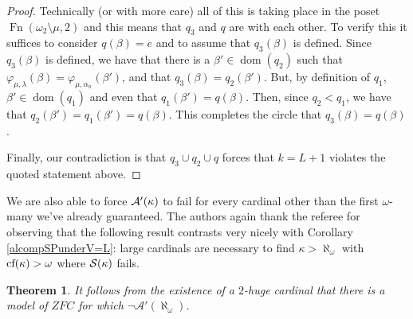 \documentclass{rmmcart}
\theoremstyle{plain}
\newtheorem{theorem}{Theorem}
\theoremstyle{definition}
\theoremstyle{remark}
\theoremstyle{plain}
\theoremstyle{definition}
\theoremstyle{remark}
\begin{document}
\begin{proof}
            Technically (or with more care)  all of this is taking place in the
            poset $\operatorname{Fn}(\omega_2\setminus \mu,2)$ and this means
            that $q_3$ and $q$ are  with each other.
            To verify this it suffices to consider
             $q(\beta)=e$ and to assume that $q_3(\beta)$ is defined.
            Since $q_3(\beta)$ is defined, we have that
            there is a  $\beta'\in\mathop{dom}(q_2)$ such that $
             \varphi_{\mu,\lambda}(\beta) = \varphi_{\mu,\alpha_n}(\beta')$,
            and that $q_3(\beta) = q_2(\beta')$.
            But, by definition of $q_1$, $\beta'\in\mathop{dom}(q_1)$
            and even  that $q_1(\beta') = q(\beta)$.
             Then, since $q_2<q_1$, we have that $q_2(\beta')=q_1(\beta') =
             q(\beta)$. This completes the circle that $q_3(\beta) = q(\beta)$.


            Finally, our contradiction is that $q_3\cup q_2\cup q$
            forces that
             $k=L+1$ violates the quoted statement above.
            \end{proof}


  We are also able to force \(\mathcal{A}'(\kappa)\) to fail for every cardinal
  other than the first \(\omega\)-many we've already guaranteed. The authors
  again thank the referee for observing that the following result
  contrasts very nicely with Corollary \ref{alcompSPunderV=L}: large cardinals
  are necessary to find \(\kappa>\aleph_\omega\) with \(\textrm{cf}(\kappa)>\omega\)
  where \(\mathcal{S}(\kappa)\) fails.


            \begin{theorem} It follows from the existence of a $2$-huge cardinal
            that there is a model of $ZFC$ for which $\lnot \mathcal A'(\aleph_{\omega})$.
            \end{theorem}
\end{document}
